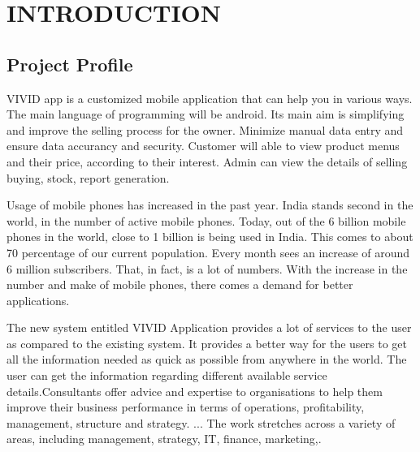 \documentclass[a4paper,12pt]{article}
\begin{document}
\tableofcontents
 \newpage
\newpage
\section{INTRODUCTION}\vspace{5mm}
\subsection{Project Profile}\vspace{5mm}
VIVID app is a customized mobile application that can help you in various ways. The main language of programming will be android. Its main  aim is simplifying and improve the selling process for the owner. Minimize manual data entry and ensure data accurancy and security. Customer will able to view product menus and their price, according to their interest. Admin can view the details of selling buying, stock, report generation.
\par  \vspace{2mm}  
Usage of mobile phones has increased in the past year. India stands second in the world, in the number of active mobile phones. Today, out of the 6 billion mobile phones in the world, close to 1 billion is being used in India. This comes to about 70 percentage  of our current population. Every month sees an increase of around 6 million subscribers. That, in fact, is a lot of numbers.
With the increase in the number and make of mobile phones, there comes a demand for better applications.
\par  \vspace{2mm}  
The new system entitled VIVID Application provides a lot of services to the user as compared to the existing system. It provides a better way for the users to get all the information needed as quick as possible from anywhere in the world. The user can get the information regarding different available service details.Consultants offer advice and expertise to organisations to help them improve their business performance in terms of operations, profitability, management, structure and strategy. ... The work stretches across a variety of areas, including management, strategy, IT, finance, marketing,.
\end{document}
